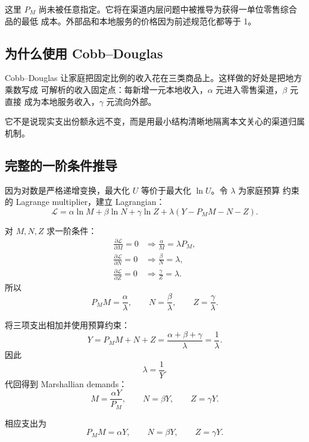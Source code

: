 \documentclass[UTF8,11pt,scheme=chinese,fontset=fandol]{ctexart}
\theoremstyle{definition}
\begin{document}
这里 \(P_M\) 尚未被任意指定。它将在渠道内层问题中被推导为获得一单位零售综合品的最低
成本。外部品和本地服务的价格因为前述规范化都等于 1。

\subsection{为什么使用 Cobb--Douglas}

Cobb--Douglas 让家庭把固定比例的收入花在三类商品上。这样做的好处是把地方乘数写成
可解析的收入固定点：每新增一元本地收入，\(\alpha\) 元进入零售渠道，\(\beta\) 元直接
成为本地服务收入，\(\gamma\) 元流向外部。

它不是说现实支出份额永远不变，而是用最小结构清晰地隔离本文关心的渠道归属机制。

\subsection{完整的一阶条件推导}

因为对数是严格递增变换，最大化 \(U\) 等价于最大化 \(\ln U\)。令 \(\lambda\) 为家庭预算
约束的 Lagrange multiplier，建立 Lagrangian：
\begin{equation}
\mathcal L
=\alpha\ln M+\beta\ln N+\gamma\ln Z
+\lambda(Y-P_MM-N-Z).
\label{teach:eq:outer-lagrangian}
\end{equation}

对 \(M,N,Z\) 求一阶条件：
\begin{align}
\frac{\partial\mathcal L}{\partial M}=0
&\Longrightarrow \frac{\alpha}{M}=\lambda P_M,\\
\frac{\partial\mathcal L}{\partial N}=0
&\Longrightarrow \frac{\beta}{N}=\lambda,\\
\frac{\partial\mathcal L}{\partial Z}=0
&\Longrightarrow \frac{\gamma}{Z}=\lambda.
\end{align}
所以
\begin{equation}
P_MM=\frac{\alpha}{\lambda},\qquad
N=\frac{\beta}{\lambda},\qquad
Z=\frac{\gamma}{\lambda}.
\end{equation}

将三项支出相加并使用预算约束：
\[
Y=P_MM+N+Z
=\frac{\alpha+\beta+\gamma}{\lambda}
=\frac1\lambda.
\]
因此
\[
\lambda=\frac1Y.
\]
代回得到 Marshallian demands：
\begin{equation}
M=\frac{\alpha Y}{P_M},\qquad
N=\beta Y,\qquad
Z=\gamma Y.
\label{teach:eq:outer-demands}
\end{equation}

相应支出为
\[
P_MM=\alpha Y,\qquad N=\beta Y,\qquad Z=\gamma Y.
\]
\end{document}
